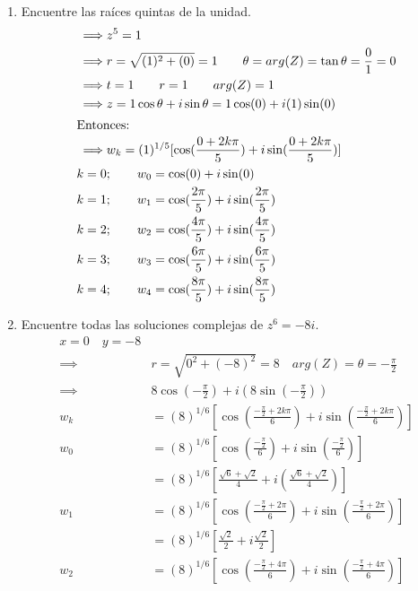\documentclass[a4paper,12pt]{article}
\begin{document}
\begin{enumerate}
    \item Encuentre las raíces quintas de la unidad.
    \begin{align}
        \implies& z^5=1 \\
        \implies& r=\sqrt{(1)^2+(0)}=1 \qquad \theta=arg(Z) = \tan \theta=\frac{0}{1}=0\\
        \implies& t=1\qquad r=1\qquad arg(Z)=1\\
        \implies& z=1\cos\theta+i\sin\theta =1\cos(0)+i(1)\sin(0)\\
        \intertext{Entonces:}
        \implies& w_k =(1)^{1/5}[\cos(\frac{0+2k\pi}{5})+i\sin(\frac{0+2k\pi}{5})]\\
        k=0&; \qquad w_0= \cos(0)+i\sin(0)\\
        k=1&; \qquad w_1= \cos(\frac{2\pi}{5})+i\sin(\frac{2\pi}{5})\\
        k=2&; \qquad w_2= \cos(\frac{4\pi}{5})+i\sin(\frac{4\pi}{5})\\
        k=3&; \qquad w_3= \cos(\frac{6\pi}{5})+i\sin(\frac{6\pi}{5})\\
        k=4&; \qquad w_4= \cos(\frac{8\pi}{5})+i\sin(\frac{8\pi}{5})
    \end{align}
    \item Encuentre todas las soluciones complejas de $z^{6}=-8 i$.
    \begin{align}
        x=0\quad y=-8 \\
        \implies& r=\sqrt{0^2+(-8)^2}=8\quad arg(Z)=\theta=-\frac{\pi}{2}\\
        \implies& 8\cos(-\frac{\pi}{2})+i(8\sin(-\frac{\pi}{2}))\\
        w_k&=(8)^{1/6}\left[\cos\left(\frac{-\frac{\pi}{2}+2k\pi}{6} \right)+i\sin\left(\frac{-\frac{\pi}{2}+2k\pi}{6} \right) \right]\\
        w_0 &=(8)^{1/6}\left[\cos\left(\frac{-\frac{\pi}{2}}{6} \right)+i\sin\left(\frac{-\frac{\pi}{2}}{6} \right) \right]\\
        &=(8)^{1/6}\left[\frac{\sqrt{6}+\sqrt{2}}{4}+i\left(\frac{\sqrt{6}+\sqrt{2}}{4} \right) \right]\\
        w_1 &=(8)^{1/6}\left[\cos\left(\frac{-\frac{\pi}{2}+2\pi}{6} \right)+i\sin\left(\frac{-\frac{\pi}{2}+2\pi}{6} \right) \right]\\
        &=(8)^{1/6}\left[\frac{\sqrt{2}}{2}+i\frac{\sqrt{2}}{2}\right]\\
        w_2 &=(8)^{1/6}\left[\cos\left(\frac{-\frac{\pi}{2}+4\pi}{6} \right)+i\sin\left(\frac{-\frac{\pi}{2}+4\pi}{6} \right) \right]\\

\end{align}
\end{enumerate}
\end{document}

